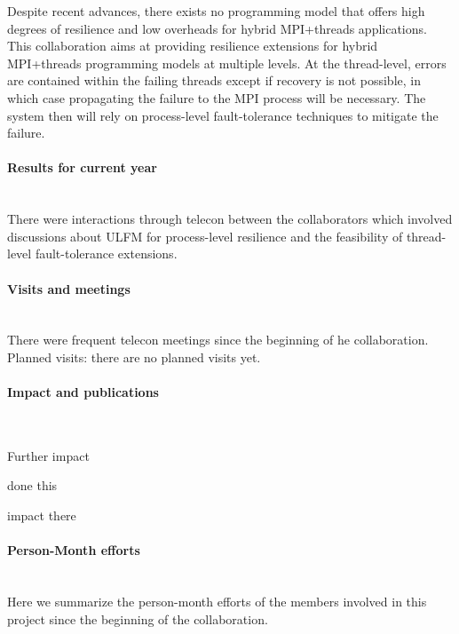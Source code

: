 \begin{refsection}
Despite recent advances, there exists no programming model that offers high
degrees of resilience and low overheads for hybrid MPI+threads applications.
This collaboration aims at providing resilience extensions for hybrid
MPI+threads programming models at multiple levels. At the thread-level, errors
are contained within the failing threads except if recovery is not possible, in
which case propagating the failure to the MPI process will be necessary. The
system then will rely on process-level fault-tolerance techniques to mitigate
the failure.

\paragraph{Results for current year}~\\

There were interactions through telecon between the collaborators which involved
discussions about ULFM for process-level resilience and the feasibility of
thread-level fault-tolerance extensions.

\paragraph{Visits and meetings}~\\

There were frequent telecon meetings since the beginning of he collaboration.
Planned visits: there are no planned visits yet.

\paragraph{Impact and publications}~\\

\printbibliography[heading=none,keyword=own]

Further impact \begin{itemize*} \item done this \item impact there
\end{itemize*}

\paragraph{Person-Month efforts}~\\

Here we summarize the person-month efforts of the members involved in this
project since the beginning of the collaboration.


\end{refsection}
